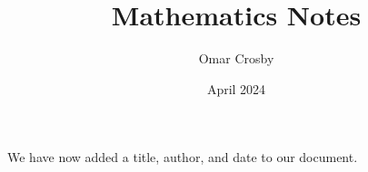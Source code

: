 \documentclass[12pt, letterpaper]{article}
\title{Mathematics Notes}
\author{Omar Crosby}
\date{April 2024}
\begin{document}
\maketitle
We have now added a title, author, and date to our document.

    

\end{document}
